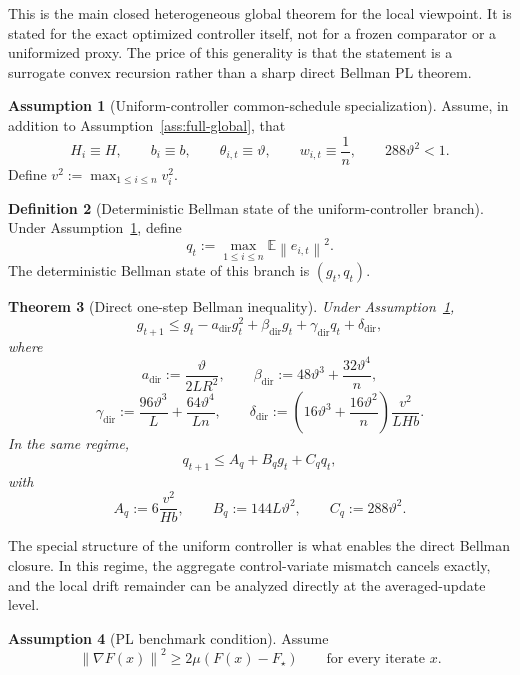 \documentclass{article}
\newtheorem{theorem}{Theorem}[section]
\theoremstyle{definition}
\newtheorem{definition}[theorem]{Definition}
\newtheorem{assumption}[theorem]{Assumption}
\newcommand{\EE}{\mathbb E}
\newcommand{\norm}[1]{\left\lVert #1\right\rVert}
\begin{document}
This is the main closed heterogeneous global theorem for the local viewpoint. It is stated
for the exact optimized controller itself, not for a frozen comparator or a
uniformized proxy. The price of this generality is that the statement is a
surrogate convex recursion rather than a sharp direct Bellman PL theorem.

\begin{assumption}[Uniform-controller common-schedule specialization]
\label{ass:uniform-special}
Assume, in addition to Assumption~\ref{ass:full-global}, that
\[
H_i\equiv H,
\qquad
b_i\equiv b,
\qquad
\theta_{i,t}\equiv \vartheta,
\qquad
w_{i,t}\equiv \frac1n,
\qquad
288\vartheta^2<1.
\]
Define $v^2:=\max_{1\le i\le n}v_i^2$.
\end{assumption}

\begin{definition}[Deterministic Bellman state of the uniform-controller branch]
\label{def:direct-state}
Under Assumption~\ref{ass:uniform-special}, define
\[
q_t:=\max_{1\le i\le n}\EE\norm{e_{i,t}}^2.
\]
The deterministic Bellman state of this branch is $(g_t,q_t)$.
\end{definition}

\begin{theorem}[Direct one-step Bellman inequality]
\label{th:direct-bellman}
Under Assumption~\ref{ass:uniform-special},
\[
g_{t+1}
\le
g_t
-
a_{\mathrm{dir}}g_t^2
+
\beta_{\mathrm{dir}}g_t
+
\gamma_{\mathrm{dir}}q_t
+
\delta_{\mathrm{dir}},
\]
where
\[
a_{\mathrm{dir}}:=\frac{\vartheta}{2LR^2},
\qquad
\beta_{\mathrm{dir}}:=48\vartheta^3+\frac{32\vartheta^4}{n},
\]
\[
\gamma_{\mathrm{dir}}:=\frac{96\vartheta^3}{L}+\frac{64\vartheta^4}{Ln},
\qquad
\delta_{\mathrm{dir}}:=\left(16\vartheta^3+\frac{16\vartheta^2}{n}\right)\frac{v^2}{L H b}.
\]
In the same regime,
\[
q_{t+1}\le A_q+B_q g_t+C_q q_t,
\]
with
\[
A_q:=6\frac{v^2}{H b},
\qquad
B_q:=144L\vartheta^2,
\qquad
C_q:=288\vartheta^2.
\]
\end{theorem}

The special structure of the uniform controller is what enables the direct
Bellman closure. In this regime, the aggregate control-variate mismatch cancels
exactly, and the local drift remainder can be analyzed directly at the
averaged-update level.

\begin{assumption}[PL benchmark condition]
\label{ass:PL-benchmark}
Assume
\[
\norm{\nabla F(x)}^2\ge 2\mu(F(x)-F_\star)
\qquad
\text{for every iterate }x.
\]
\end{assumption}
\end{document}
